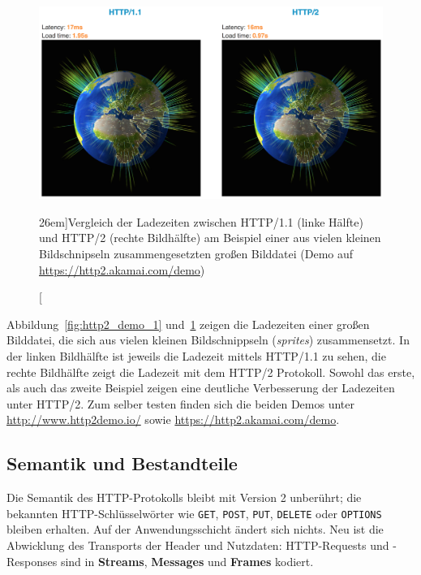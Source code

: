 \documentclass[a4paper, justified, notoc]{tufte-handout} %
\begin{document}
\begin{figure}%
	\centering
  \includegraphics[width=1.5\textwidth]{./figures/http2_demo_globe.png}
  \caption[][26em]{Vergleich der Ladezeiten zwischen HTTP/1.1 (linke Hälfte) und HTTP/2 (rechte Bildhälfte) am Beispiel einer aus vielen kleinen Bildschnipseln zusammengesetzten großen Bilddatei (Demo auf \url{https://http2.akamai.com/demo})}
  \label{fig:http2_demo_2}
\end{figure}

Abbildung~\ref{fig:http2_demo_1} und~\ref{fig:http2_demo_2} zeigen die Ladezeiten einer großen Bilddatei, die sich aus vielen kleinen Bildschnippseln (\emph{sprites}) zusammensetzt. In der linken Bildhälfte ist jeweils  die Ladezeit mittels HTTP/1.1 zu sehen, die rechte Bildhälfte zeigt die Ladezeit mit dem HTTP/2 Protokoll. Sowohl das erste, als auch das zweite Beispiel zeigen eine deutliche Verbesserung der Ladezeiten unter HTTP/2.
Zum selber testen finden sich die beiden Demos unter \url{http://www.http2demo.io/} sowie \url{https://http2.akamai.com/demo}.





 

\subsection{Semantik und Bestandteile} %
\label{sub:semantik_und_bestandteile}
Die Semantik des HTTP-Protokolls bleibt mit Version 2 unberührt; die bekannten HTTP-Schlüsselwörter wie \texttt{GET}, \texttt{POST}, \texttt{PUT}, \texttt{DELETE} oder \texttt{OPTIONS} bleiben erhalten. Auf der Anwendungsschicht ändert sich nichts. Neu ist die Abwicklung des Transports der Header und Nutzdaten: HTTP-Requests und -Responses sind in \textbf{Streams}, \textbf{Messages} und \textbf{Frames} kodiert. %
\end{document}
